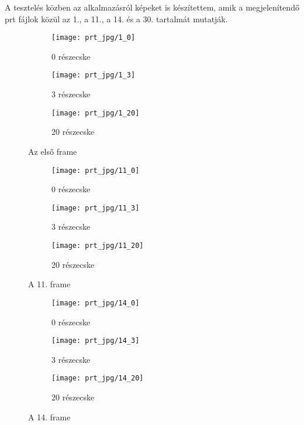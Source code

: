 A tesztelés közben az alkalmazásról képeket is készítettem,
amik a megjelenítendő prt fájlok közül az 1., a 11., a 14. 
és a 30. tartalmát mutatják.

\begin{figure}[!htb]
    \centering
    \begin{subfigure}[!htb]{0.32\textwidth}
        \centering
        \texttt{[image: prt\_jpg/1\_0]}
        \caption{0 részecske}
    \end{subfigure}
    \hfill
    \begin{subfigure}[!htb]{0.32\textwidth}
        \centering
        \texttt{[image: prt\_jpg/1\_3]}
        \caption{3 részecske}
    \end{subfigure}
    \hfill
    \begin{subfigure}[!htb]{0.32\textwidth}
        \centering
        \texttt{[image: prt\_jpg/1\_20]}
        \caption{20 részecske}
    \end{subfigure}
    \caption{Az első frame}
    \label{fig:x firstframe}
\end{figure}

\begin{figure}[!htb]
    \centering
    \begin{subfigure}[!htb]{0.32\textwidth}
        \centering
        \texttt{[image: prt\_jpg/11\_0]}
        \caption{0 részecske}
    \end{subfigure}
    \hfill
    \begin{subfigure}[!htb]{0.32\textwidth}
        \centering
        \texttt{[image: prt\_jpg/11\_3]}
        \caption{3 részecske}
    \end{subfigure}
    \hfill
    \begin{subfigure}[!htb]{0.32\textwidth}
        \centering
        \texttt{[image: prt\_jpg/11\_20]}
        \caption{20 részecske}
    \end{subfigure}
    \caption{A 11. frame}
    \label{fig:x frameeleven}
\end{figure}

\begin{figure}[!htb]
    \centering
    \begin{subfigure}[!htb]{0.32\textwidth}
        \centering
        \texttt{[image: prt\_jpg/14\_0]}
        \caption{0 részecske}
    \end{subfigure}
    \hfill
    \begin{subfigure}[!htb]{0.32\textwidth}
        \centering
        \texttt{[image: prt\_jpg/14\_3]}
        \caption{3 részecske}
    \end{subfigure}
    \hfill
    \begin{subfigure}[!htb]{0.32\textwidth}
        \centering
        \texttt{[image: prt\_jpg/14\_20]}
        \caption{20 részecske}
    \end{subfigure}
    \caption{A 14. frame}
    \label{fig:x frame14}
\end{figure}


